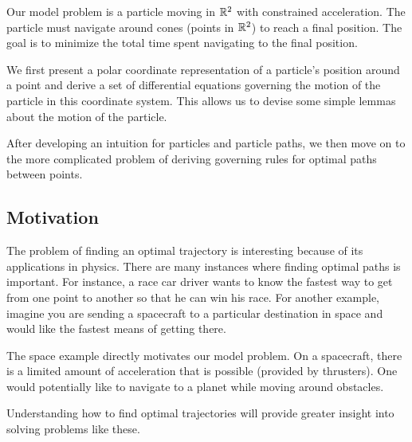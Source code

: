 Our model problem is a particle moving in $\mathbb R^2$ with constrained acceleration. The particle must navigate around cones (points in $\mathbb R^2$) to reach a final position. The goal is to minimize the total time spent navigating to the final position. 

We first present a polar coordinate representation of a particle's position around a point and derive a set of differential equations governing the motion of the particle in this coordinate system. This allows us to devise some simple lemmas about the motion of the particle.

After developing an intuition for particles and particle paths, we then move on to the more complicated problem of deriving governing rules for optimal paths between points.

\subsection{Motivation}

The problem of finding an optimal trajectory is interesting because of its applications in physics. There are many instances where finding optimal paths is important. For instance, a race car driver wants to know the fastest way to get from one point to another so that he can win his race. For another example, imagine you are sending a spacecraft to a particular destination in space and would like the fastest means of getting there.

The space example directly motivates our model problem. On a spacecraft, there is a limited amount of acceleration that is possible (provided by thrusters). One would potentially like to navigate to a planet while moving around obstacles. 

Understanding how to find optimal trajectories will provide greater insight into solving problems like these.

